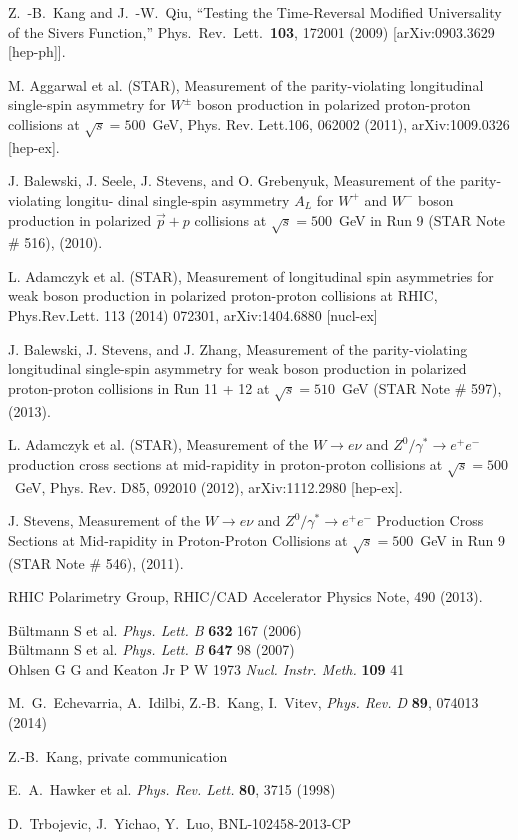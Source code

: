 \documentclass[12pt]{article}
\begin{document}
\begin{thebibliography}{9}


  Z.~-B.~Kang and J.~-W.~Qiu,
  ``Testing the Time-Reversal Modified Universality of the Sivers Function,''
  Phys.\ Rev.\ Lett.\  {\bf 103}, 172001 (2009)
  [arXiv:0903.3629 [hep-ph]].

M. Aggarwal et al. (STAR), Measurement of the parity-violating longitudinal single-spin asymmetry
for $W^{\pm}$ boson production in polarized proton-proton collisions at $\sqrt{s} = 500$~GeV, 
Phys. Rev. Lett.106, 062002 (2011), 
arXiv:1009.0326 [hep-ex].

J. Balewski, J. Seele, J. Stevens, and O. Grebenyuk, Measurement of the parity-violating longitu-
dinal single-spin asymmetry $A_{L}$ for $W^{+}$ and $W^{-}$ boson production in polarized $\vec{p} + p$ collisions at
$\sqrt{s}=500$~GeV in Run 9 (STAR Note \# 516), (2010).

L. Adamczyk et al. (STAR), Measurement of longitudinal spin asymmetries for weak boson production in polarized proton-proton collisions at RHIC, 
Phys.Rev.Lett. 113 (2014) 072301, 
arXiv:1404.6880 [nucl-ex]

J. Balewski, J. Stevens, and J. Zhang, Measurement of the parity-violating longitudinal single-spin
asymmetry for weak boson production in polarized proton-proton collisions in Run 11 + 12 at
$\sqrt{s} = 510$~GeV (STAR Note \# 597), (2013).

L. Adamczyk et al. (STAR), Measurement of the $W\rightarrow e\nu$ and $Z^{0}/\gamma^{*}\rightarrow e^{+}e^{-}$ 
production cross sections at mid-rapidity in proton-proton collisions at
$\sqrt{s} = 500$~GeV, 
Phys. Rev. D85, 092010 (2012), 
arXiv:1112.2980 [hep-ex].

J. Stevens, Measurement of the $W\rightarrow e\nu$ and $Z^{0}/\gamma^{*}\rightarrow e^{+}e^{-}$  
Production Cross Sections at Mid-rapidity in Proton-Proton Collisions at
$\sqrt{s}=500$~GeV in Run 9 (STAR Note \# 546), (2011).

RHIC Polarimetry Group, RHIC/CAD Accelerator Physics Note, 490 (2013).

B\"{u}ltmann S et al. {\it Phys. Lett. B} {\bf 632} 167 (2006)\\
B\"{u}ltmann S et al. {\it Phys. Lett. B} {\bf 647} 98 (2007)\\
Ohlsen G G and Keaton Jr P W 1973 {\it Nucl. Instr. Meth.} {\bf 109} 41

M.~G.~Echevarria, A.~Idilbi, Z.-B.~Kang, I.~Vitev,
{\it Phys. Rev. D} {\bf 89}, 074013 (2014)

Z.-B.~Kang, private communication

E.~A.~Hawker et al. {\it Phys. Rev. Lett.} {\bf 80}, 3715 (1998)

D.~Trbojevic, J.~Yichao, Y.~Luo, BNL-102458-2013-CP
\end{thebibliography}
\end{document}
